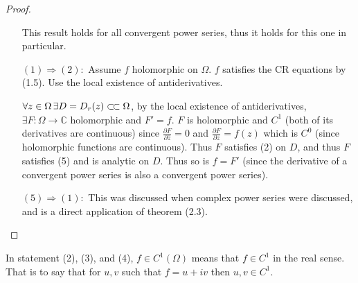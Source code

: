 \begin{proof}
\begin{enumerate}
This result holds for all convergent power series, thus it holds for this one in particular.
    
    
    
    
\item[$(1) \Rightarrow (2):$] Assume $f$ holomorphic on $\Omega$. $f$ satisfies the CR equations by (1.5). Use the local existence of antiderivatives. 

$\forall z \in \Omega \, \exists D = D_r(z) \ssubset \Omega$, by the local existence of antiderivatives, $\exists F: \Omega \rightarrow \mathbb{C}$ holomorphic and $F' = f$. $F$ is holomorphic and $C^1$ (both of its derivatives are continuous) since $\frac{\partial F}{ \partial \overline{z}} =0$ and $\frac{\partial F}{ \partial z} =f(z)$ which is $C^0$ (since holomorphic functions are continuous). Thus $F$ satisfies (2) on $D$, and thus $F$ satisfies (5) and is analytic on $D$. Thus so is $f= F'$ (since the derivative of a convergent power series is also a convergent power series).
   
   
\item[$(5) \Rightarrow (1):$] This was discussed when complex power series were discussed, and is a direct application of theorem (2.3).
    
    
\end{enumerate}

\end{proof} 


\begin{note}
In statement (2), (3), and (4), $f\in C^1(\Omega)$ means that $f\in C^1$ in the real sense. That is to say that for $u,v$ such that $f=u+iv$ then $u,v \in C^1$.
\end{note}
